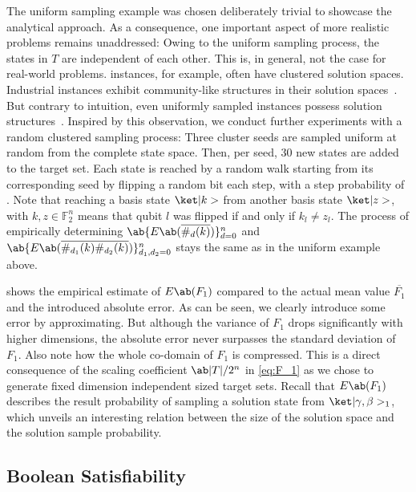 The uniform sampling example was chosen deliberately trivial to showcase the analytical approach. As a consequence, one important aspect of more realistic problems remains unaddressed: Owing to the uniform sampling process, the states in $T$ are independent of each other. This is, in general, not the case for real-world problems. \SAT instances, for example, often have clustered solution spaces. Industrial \SAT instances exhibit community-like structures in their solution spaces~\cite{AnsoteguiGL12}. But contrary to intuition, even uniformly sampled \SAT instances possess solution structures~\cite{PariLYQ04}. Inspired by this observation, we conduct further experiments with a random clustered sampling process: Three cluster seeds are sampled uniform at random from the complete state space. Then, per seed, 30 new states are added to the target set. Each state is reached by a random walk starting from its corresponding seed by flipping a random bit each step, with a step probability of . Note that reaching a basis state $\ket|k>$ from another basis state $\ket|z>$, with $k, z \in \mathds{F}_2^n$ means that qubit $l$ was flipped if and only if $k_l \neq z_l$. The process of empirically determining $\ab\{E\ab(\overline{\#_d (k)})\}_{d=0}^n$ and $\ab\{E\ab(\overline{\#_{d_1} (k) \#_{d_2} (k)})\}_{d_1, d_2 = 0}^n$ stays the same as in the uniform example above.

 shows the empirical estimate of $E\ab(F_1)$ compared to the actual mean value $\overline{F_1}$ and the introduced absolute error. As can be seen, we clearly introduce some error by approximating. But although the variance of $F_1$ drops significantly with higher dimensions, the absolute error never surpasses the standard deviation of $F_1$. Also note how the whole co-domain of $F_1$ is compressed. This is a direct consequence of the scaling coefficient \(\ab|T|/2^n\) in \cref{eq:F_1} as we chose to generate fixed dimension independent sized target sets. Recall that $E\ab(F_1)$ describes the result probability of sampling a solution state from $\ket|\pangle, \mangle>_1$, which unveils an interesting relation between the size of the solution space and the solution sample probability.  


\subsection{Boolean Satisfiability}
\label{sec:sat_example}

